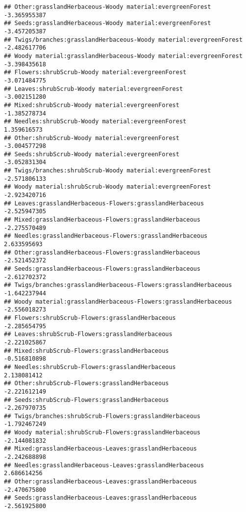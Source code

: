 \documentclass[
]{article}
\begin{document}
\begin{verbatim}
## Other:grasslandHerbaceous-Woody material:evergreenForest              -3.365955387
## Seeds:grasslandHerbaceous-Woody material:evergreenForest              -3.457205387
## Twigs/branches:grasslandHerbaceous-Woody material:evergreenForest     -2.482617706
## Woody material:grasslandHerbaceous-Woody material:evergreenForest     -3.398435618
## Flowers:shrubScrub-Woody material:evergreenForest                     -3.071484775
## Leaves:shrubScrub-Woody material:evergreenForest                      -3.002151280
## Mixed:shrubScrub-Woody material:evergreenForest                       -1.385278734
## Needles:shrubScrub-Woody material:evergreenForest                      1.359616573
## Other:shrubScrub-Woody material:evergreenForest                       -3.004577298
## Seeds:shrubScrub-Woody material:evergreenForest                       -3.052831304
## Twigs/branches:shrubScrub-Woody material:evergreenForest              -2.571806133
## Woody material:shrubScrub-Woody material:evergreenForest              -2.923420716
## Leaves:grasslandHerbaceous-Flowers:grasslandHerbaceous                -2.525947305
## Mixed:grasslandHerbaceous-Flowers:grasslandHerbaceous                 -2.275570489
## Needles:grasslandHerbaceous-Flowers:grasslandHerbaceous                2.633595693
## Other:grasslandHerbaceous-Flowers:grasslandHerbaceous                 -2.521452372
## Seeds:grasslandHerbaceous-Flowers:grasslandHerbaceous                 -2.612702372
## Twigs/branches:grasslandHerbaceous-Flowers:grasslandHerbaceous        -1.642237944
## Woody material:grasslandHerbaceous-Flowers:grasslandHerbaceous        -2.556018273
## Flowers:shrubScrub-Flowers:grasslandHerbaceous                        -2.285654795
## Leaves:shrubScrub-Flowers:grasslandHerbaceous                         -2.221025867
## Mixed:shrubScrub-Flowers:grasslandHerbaceous                          -0.516810898
## Needles:shrubScrub-Flowers:grasslandHerbaceous                         2.138081412
## Other:shrubScrub-Flowers:grasslandHerbaceous                          -2.221612149
## Seeds:shrubScrub-Flowers:grasslandHerbaceous                          -2.267970735
## Twigs/branches:shrubScrub-Flowers:grasslandHerbaceous                 -1.792467249
## Woody material:shrubScrub-Flowers:grasslandHerbaceous                 -2.144081832
## Mixed:grasslandHerbaceous-Leaves:grasslandHerbaceous                  -2.242688898
## Needles:grasslandHerbaceous-Leaves:grasslandHerbaceous                 2.686614256
## Other:grasslandHerbaceous-Leaves:grasslandHerbaceous                  -2.470675800
## Seeds:grasslandHerbaceous-Leaves:grasslandHerbaceous                  -2.561925800

\end{verbatim}
\end{document}
